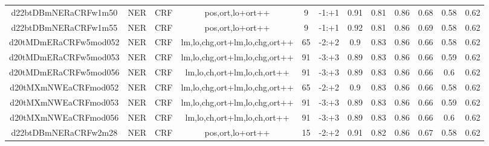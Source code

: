 \documentclass[a4paper]{article}
\begin{document}
\begin{landscape}
\begin{center}
\begin{tabular}{ |c|c|c|c|c|c|c|c|c|c|c|c|}
 	\small{ d22btDBmNERaCRFw1m50 } & \small{ NER} & \small{  CRF }  & pos,ort,lo+ort++  &  9 &  \small{  -1:+1 }  &  0.91 & 0.81 & 0.86  &  0.68 & 0.58 & 0.62 \\
 	

 
 	
 	\small{ d22btDBmNERaCRFw1m55 } & \small{ NER} & \small{  CRF }  & pos,ort,lo+ort++  &  9 &  \small{  -1:+1 }  &  0.92 & 0.81 & 0.86  &  0.69 & 0.58 & 0.62 \\
 	

 
 	
 	\small{ d20tMDmERaCRFw5mod052 } & \small{ NER} & \small{  CRF }  & lm,lo,chg,ort+lm,lo,chg,ort++  &  65 &  \small{  -2:+2 }  &  0.9 & 0.83 & 0.86  &  0.66 & 0.58 & 0.62 \\
 	

 
 	
 	\small{ d20tMDmERaCRFw5mod053 } & \small{ NER} & \small{  CRF }  & lm,lo,chg,ort+lm,lo,chg,ort++  &  91 &  \small{  -3:+3 }  &  0.89 & 0.83 & 0.86  &  0.66 & 0.59 & 0.62 \\
 	

 
 	
 	\small{ d20tMDmERaCRFw5mod056 } & \small{ NER} & \small{  CRF }  & lm,lo,ch,ort+lm,lo,ch,ort++  &  91 &  \small{  -3:+3 }  &  0.89 & 0.83 & 0.86  &  0.66 & 0.6 & 0.62 \\
 	

 
 	
 	\small{ d20tMXmNWEaCRFmod052 } & \small{ NER} & \small{  CRF }  & lm,lo,chg,ort+lm,lo,chg,ort++  &  65 &  \small{  -2:+2 }  &  0.9 & 0.83 & 0.86  &  0.66 & 0.58 & 0.62 \\
 	

 
 	
 	\small{ d20tMXmNWEaCRFmod053 } & \small{ NER} & \small{  CRF }  & lm,lo,chg,ort+lm,lo,chg,ort++  &  91 &  \small{  -3:+3 }  &  0.89 & 0.83 & 0.86  &  0.66 & 0.59 & 0.62 \\
 	

 
 	
 	\small{ d20tMXmNWEaCRFmod056 } & \small{ NER} & \small{  CRF }  & lm,lo,ch,ort+lm,lo,ch,ort++  &  91 &  \small{  -3:+3 }  &  0.89 & 0.83 & 0.86  &  0.66 & 0.6 & 0.62 \\
 	

 
 	
 	\small{ d22btDBmNERaCRFw2m28 } & \small{ NER} & \small{  CRF }  & pos,ort,lo+ort++  &  15 &  \small{  -2:+2 }  &  0.91 & 0.82 & 0.86  &  0.67 & 0.58 & 0.62 \\
 	


\end{tabular}
\end{center}
\end{landscape}
\end{document}
